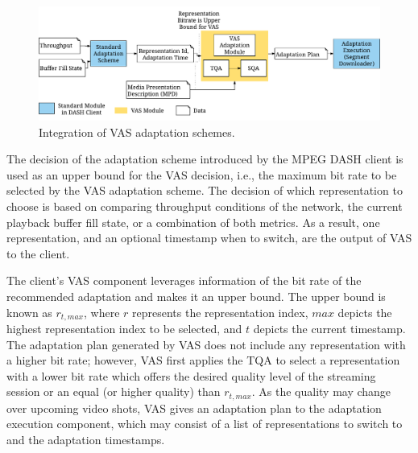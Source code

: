 \begin{figure}
\centering
\includegraphics[width=0.98\linewidth]{gfx/700_VAS/VAS_CLIENT_INTEGRATION}
\caption{Integration of VAS adaptation schemes.}
\label{fig:vasclientintegration}
\end{figure} 
The decision of the adaptation scheme introduced by the \ac{MPEG} \ac{DASH} client is used as an upper bound for the \ac{VAS} decision, i.e., the maximum bit rate to be selected by the \ac{VAS} adaptation scheme.
The decision of which representation to choose is based on comparing throughput conditions of the network, the current playback buffer fill state, or a combination of both metrics.
As a result, one representation, and an optional timestamp when to switch, are the output of \ac{VAS} to the client. 

The client's \ac{VAS} component leverages information of the bit rate of the recommended adaptation and makes it an upper bound. 
The upper bound is known as $r_{t,max}$, where $r$ represents the representation index, $max$ depicts the highest representation index to be selected, and $t$ depicts the current timestamp.
The adaptation plan generated by \ac{VAS} does not include any representation with a higher bit rate; however, \ac{VAS} first applies the \ac{TQA} to select a representation with a lower bit rate which offers the desired quality level of the streaming session or an equal (or higher quality) than $r_{t,max}$.
As the quality may change over upcoming video shots, \ac{VAS} gives an adaptation plan to the adaptation execution component, which may consist of a list of representations to switch to and the adaptation timestamps.